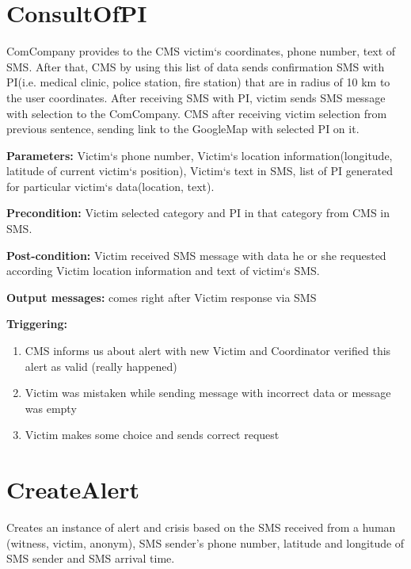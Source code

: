 \section{ConsultOfPI}
\label{operation:ConsultOfPI}
ComCompany provides to the CMS victim`s coordinates, phone number, text of
SMS. After that, CMS by using this list of data sends confirmation SMS
with PI(i.e. medical clinic, police station, fire station) that are in radius of
10 km to the user coordinates. After receiving SMS with PI, victim
sends SMS message with selection to the ComCompany. CMS after receiving victim
selection from previous sentence, sending link to the GoogleMap with selected
PI on it. 
\begin{description}

\item \textbf{Parameters:} Victim`s phone number, Victim`s location
information(longitude, latitude of current victim`s position), Victim`s text in
SMS, list of PI generated for particular victim`s data(location, text).
\item \textbf{Precondition:} Victim selected category and PI in that category
from CMS in SMS.
\item \textbf{Post-condition:} Victim received SMS message with data he or she
requested according Victim location information and text of victim`s SMS.
\item \textbf{Output messages:} comes right after Victim response via SMS

\item \textbf{Triggering:}
\begin{enumerate}
\item CMS informs us about alert with new Victim and Coordinator verified this
alert as valid (really happened)
\item Victim was mistaken while sending message with incorrect data or message was empty
\item Victim makes some choice and sends correct request
\end{enumerate}
 
\end{description}

\section{CreateAlert}
\label{operation:CreateAlert}
Creates an instance of alert and crisis based on the SMS received from a human
(witness, victim, anonym), SMS sender's phone number, latitude and longitude of
SMS sender and SMS arrival time.

